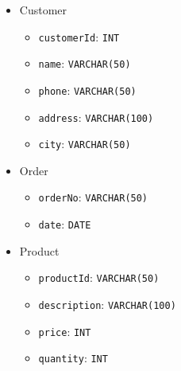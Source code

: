 \documentclass{assignment}
\begin{document}
\noindent
\begin{minipage}[t]{0.31\textwidth}
    \begin{itemize}[noitemsep]
        \item Customer
            \begin{itemize}[noitemsep, leftmargin=1em]
                \item \texttt{customerId}: {\small\texttt{INT}}
                \item \texttt{name}: {\small\texttt{VARCHAR(50)}}
                \item \texttt{phone}: {\small\texttt{VARCHAR(50)}}
                \item \texttt{address}: {\small\texttt{VARCHAR(100)}}
                \item \texttt{city}: {\small\texttt{VARCHAR(50)}}
            \end{itemize}
    \end{itemize}
\end{minipage}
\hfill
\begin{minipage}[t]{0.31\textwidth}
    \begin{itemize}[noitemsep, leftmargin=1em]
        \item Order
            \begin{itemize}[noitemsep, leftmargin=1em]
                \item \texttt{orderNo}: {\small\texttt{VARCHAR(50)}}
                \item \texttt{date}: {\small\texttt{DATE}}
            \end{itemize}
    \end{itemize}
\end{minipage}
\hfill
\begin{minipage}[t]{0.31\textwidth}
    \begin{itemize}[noitemsep, leftmargin=1em]
        \item Product
            \begin{itemize}[noitemsep, leftmargin=1em]
                \item \texttt{productId}: {\small\texttt{VARCHAR(50)}}
                \item \texttt{description}: {\small\texttt{VARCHAR(100)}}
                \item \texttt{price}: {\small\texttt{INT}}
                \item \texttt{quantity}: {\small\texttt{INT}}
            \end{itemize}
    \end{itemize}
\end{minipage}
\end{document}
